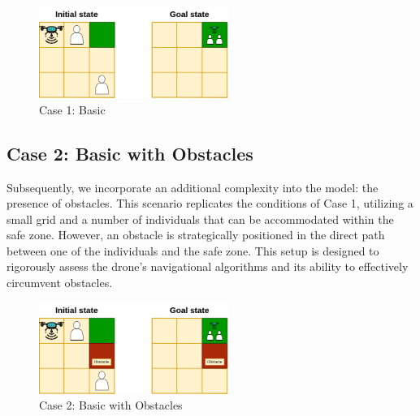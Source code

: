 \documentclass{article}
\begin{document}
\begin{figure}[ht]
    \centering
    \includegraphics[width=0.55\textwidth]{assets/problem-1-basic.drawio.png}
    \caption{Case 1: Basic}
    \label{fig:initial-state}
\end{figure}

\FloatBarrier

\subsection{Case 2: Basic with Obstacles}

Subsequently, we incorporate an additional complexity into the model: the presence of obstacles. This scenario replicates the conditions of Case 1, utilizing a small grid and a number of individuals that can be accommodated within the safe zone. However, an obstacle is strategically positioned in the direct path between one of the individuals and the safe zone. This setup is designed to rigorously assess the drone's navigational algorithms and its ability to effectively circumvent obstacles.

\begin{figure}[ht]
    \centering
    \includegraphics[width=0.55\textwidth]{assets/problem-2-basic-obstacle.drawio.png}
    \caption{Case 2: Basic with Obstacles}
    \label{fig:initial-state-obstacles}
\end{figure}

\FloatBarrier
\end{document}

